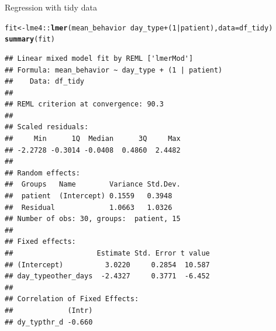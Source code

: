 \documentclass[10pt]{beamer}\usepackage[]{graphicx}\usepackage[]{color}
\makeatletter
\newcommand{\hlnum}[1]{\textcolor[rgb]{0.686,0.059,0.569}{#1}}%
\newcommand{\hlopt}[1]{\textcolor[rgb]{0,0,0}{#1}}%
\newcommand{\hlstd}[1]{\textcolor[rgb]{0.345,0.345,0.345}{#1}}%
\newcommand{\hlkwb}[1]{\textcolor[rgb]{0.69,0.353,0.396}{#1}}%
\newcommand{\hlkwc}[1]{\textcolor[rgb]{0.333,0.667,0.333}{#1}}%
\newcommand{\hlkwd}[1]{\textcolor[rgb]{0.737,0.353,0.396}{\textbf{#1}}}%
\newenvironment{kframe}{%
 \def\at@end@of@kframe{}%
 \ifinner\ifhmode%
  \def\at@end@of@kframe{\end{minipage}}%
  \begin{minipage}{\columnwidth}%
 \fi\fi%
 \def\FrameCommand##1{\hskip\@totalleftmargin \hskip-\fboxsep
 \colorbox{shadecolor}{##1}\hskip-\fboxsep
     \hskip-\linewidth \hskip-\@totalleftmargin \hskip\columnwidth}%
 \MakeFramed {\advance\hsize-\width
   \@totalleftmargin\z@ \linewidth\hsize
   \@setminipage}}%
 {\par\unskip\endMakeFramed%
 \at@end@of@kframe}
\newenvironment{knitrout}{}{} %
\makeatother
\begin{document}
\begin{frame}[fragile]{Regression with tidy data}
	
	
\begin{knitrout}\tiny
{}\color{fgcolor}\begin{kframe}
\begin{alltt}
\hlstd{fit} \hlkwb{<-} \hlstd{lme4}\hlopt{::}\hlkwd{lmer}\hlstd{(mean_behavior} \hlopt{~} \hlstd{day_type} \hlopt{+} \hlstd{(}\hlnum{1}\hlopt{|}\hlstd{patient),} \hlkwc{data} \hlstd{= df_tidy)}
\hlkwd{summary}\hlstd{(fit)}
\end{alltt}
\begin{verbatim}
## Linear mixed model fit by REML ['lmerMod']
## Formula: mean_behavior ~ day_type + (1 | patient)
##    Data: df_tidy
## 
## REML criterion at convergence: 90.3
## 
## Scaled residuals: 
##     Min      1Q  Median      3Q     Max 
## -2.2728 -0.3014 -0.0408  0.4860  2.4482 
## 
## Random effects:
##  Groups   Name        Variance Std.Dev.
##  patient  (Intercept) 0.1559   0.3948  
##  Residual             1.0663   1.0326  
## Number of obs: 30, groups:  patient, 15
## 
## Fixed effects:
##                    Estimate Std. Error t value
## (Intercept)          3.0220     0.2854  10.587
## day_typeother_days  -2.4327     0.3771  -6.452
## 
## Correlation of Fixed Effects:
##             (Intr)
## dy_typthr_d -0.660
\end{verbatim}
\end{kframe}
\end{knitrout}
\end{frame}
\end{document}

